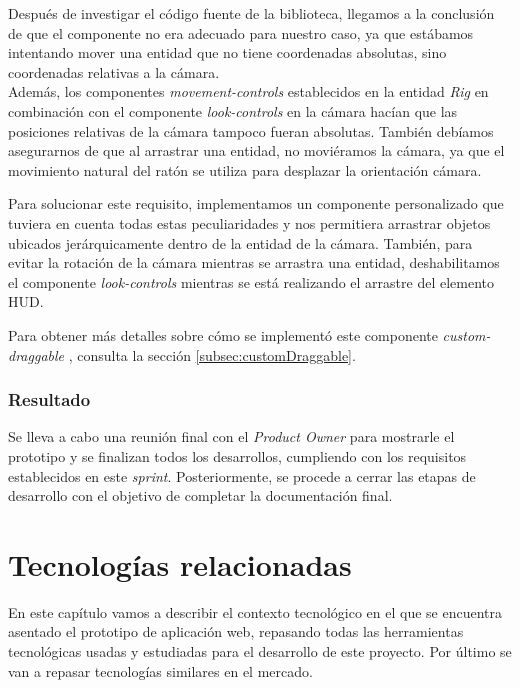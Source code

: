 \documentclass[a4paper, 11pt]{book}
\begin{document}
Después de investigar el código fuente de la biblioteca, llegamos a la conclusión de que el componente no era adecuado para nuestro caso, ya que estábamos intentando mover una entidad que no tiene coordenadas absolutas, sino coordenadas relativas a la cámara. \\
Además, los componentes \emph{movement-controls} establecidos en la entidad \emph{Rig} en combinación con el componente \emph{look-controls} en la cámara hacían que las posiciones relativas de la cámara tampoco fueran absolutas. También debíamos asegurarnos de que al arrastrar una entidad, no moviéramos la cámara, ya que el movimiento natural del ratón se utiliza para desplazar la orientación cámara.

Para solucionar este requisito, implementamos un componente personalizado que tuviera en cuenta todas estas peculiaridades y nos permitiera arrastrar objetos ubicados jerárquicamente dentro de la entidad de la cámara. También, para evitar la rotación de la cámara mientras se arrastra una entidad, deshabilitamos el componente \emph{look-controls} mientras se está realizando el arrastre del elemento \textsc{HUD}.

Para obtener más detalles sobre cómo se implementó este componente \emph{custom-draggable} , consulta la sección \ref{subsec:customDraggable}.

\subsection{Resultado}
Se lleva a cabo una reunión final con el \emph{Product Owner} para mostrarle el prototipo y se finalizan todos los desarrollos, cumpliendo con los requisitos establecidos en este \emph{sprint}. Posteriormente, se procede a cerrar las etapas de desarrollo con el objetivo de completar la documentación final. 

\chapter{Tecnologías relacionadas}
\label{chap:tecnologias}
En este capítulo vamos a describir el contexto tecnológico en el que se encuentra asentado el prototipo de aplicación web, repasando todas las herramientas tecnológicas usadas y estudiadas para el desarrollo de este proyecto.
Por último se van a repasar tecnologías similares en el mercado.
\end{document}
